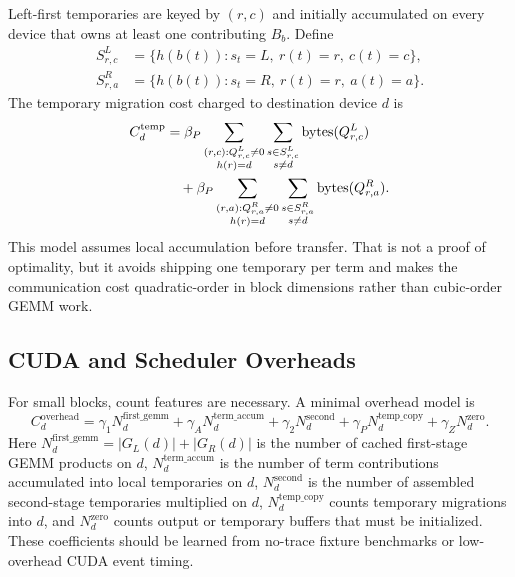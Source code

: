 \documentclass[11pt]{article}
\begin{document}
Left-first temporaries are keyed by $(r,c)$ and initially accumulated on every
device that owns at least one contributing $B_b$.  Define
\begin{align}
  S^L_{r,c} &= \{h(b(t)): s_t=L,\ r(t)=r,\ c(t)=c\},\\
  S^R_{r,a} &= \{h(b(t)): s_t=R,\ r(t)=r,\ a(t)=a\}.
\end{align}
The temporary migration cost charged to destination device $d$ is
\begin{align}
  C^{\mathrm{temp}}_d &=
    \beta_P
    \sum_{\substack{(r,c): Q^L_{r,c}\ne 0\\h(r)=d}}
      \sum_{\substack{s\in S^L_{r,c}\\s\ne d}}
        \operatorname{bytes}(Q^L_{r,c}) \notag\\
  &\quad+
    \beta_P
    \sum_{\substack{(r,a): Q^R_{r,a}\ne 0\\h(r)=d}}
      \sum_{\substack{s\in S^R_{r,a}\\s\ne d}}
        \operatorname{bytes}(Q^R_{r,a}).
\end{align}
This model assumes local accumulation before transfer.  That is not a proof of
optimality, but it avoids shipping one temporary per term and makes the
communication cost quadratic-order in block dimensions rather than cubic-order
GEMM work.

\subsection{CUDA and Scheduler Overheads}

For small blocks, count features are necessary.  A minimal overhead model is
\begin{equation}
  C^{\mathrm{overhead}}_d =
    \gamma_1 N^{\mathrm{first\_gemm}}_d
  + \gamma_A N^{\mathrm{term\_accum}}_d
  + \gamma_2 N^{\mathrm{second}}_d
  + \gamma_P N^{\mathrm{temp\_copy}}_d
  + \gamma_Z N^{\mathrm{zero}}_d .
\end{equation}
Here $N^{\mathrm{first\_gemm}}_d=|G_L(d)|+|G_R(d)|$ is the number of cached
first-stage GEMM products on $d$, $N^{\mathrm{term\_accum}}_d$ is the number
of term contributions accumulated into local temporaries on $d$,
$N^{\mathrm{second}}_d$ is the number of assembled second-stage temporaries
multiplied on $d$, $N^{\mathrm{temp\_copy}}_d$ counts temporary migrations
into $d$, and $N^{\mathrm{zero}}_d$ counts output or temporary buffers that
must be initialized.  These coefficients should be learned from no-trace
fixture benchmarks or low-overhead CUDA event timing.
\end{document}
